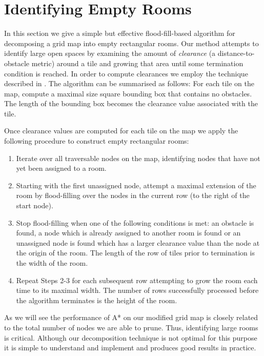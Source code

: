 \section{Identifying Empty Rooms}
\label{empty rooms}
In this section we give a simple but effective flood-fill-based algorithm for decomposing a 
grid map into empty rectangular rooms.
Our method attempts to identify large open spaces by examining the amount of \emph{clearance}
(a distance-to-obstacle metric) around a tile and growing that area until some termination 
condition is reached.
In order to compute clearances we employ the technique described in \cite{harabor08}.
The algorithm can be summarised as follows:
For each tile on the map, compute a maximal size square bounding box that contains no obstacles.
The length of the bounding box becomes the clearance value associated with the tile.
%
\par
Once clearance values are computed for each tile on the map we apply the following
procedure to construct empty rectangular rooms:


\begin{enumerate}
\item{Iterate over all traversable nodes on the map, identifying nodes that have not yet 
been assigned to a room.}
\item{Starting with the first unassigned node, attempt a maximal extension of the room
by flood-filling over the nodes in the current row (to the right of the start node).}
\item{Stop flood-filling when one of the following conditions is met: an obstacle is found,
a node which is already assigned to another room is found or an unassigned
node is found which has a larger clearance value than the node at the origin of the room.
The length of the row of tiles prior to termination is the width of the room.}
\item{Repeat Steps 2-3 for each subsequent row attempting to grow the room
each time to its maximal width.
The number of rows successfully processed before the algorithm terminates is the height of the room.}
\end{enumerate}


As we will see the performance of A* on our modified grid map is closely related to the total 
number of nodes we are able to prune.
Thus, identifying large rooms is critical.
Although our decomposition technique is not optimal for this purpose it is simple
to understand and implement and produces good results in practice.
